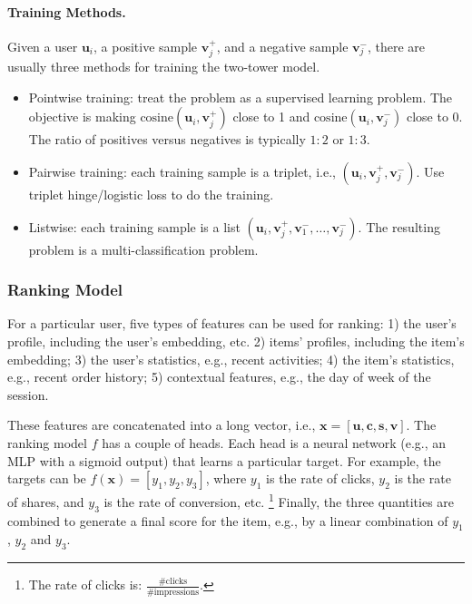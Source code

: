         \paragraph{Training Methods.}
            Given a user $\bm{u}_i$, a positive sample $\bm{v}_j^+$, and a negative sample $\bm{v}_j^-$, there are usually three methods for training the two-tower model.
            \begin{itemize}
                \item Pointwise training: treat the problem as a supervised learning problem. 
                The objective is making $\text{cosine}(\bm{u}_i, \bm{v}_j^+)$ close to 1 and $\text{cosine}(\bm{u}_i, \bm{v}_j^-)$ close to 0. 
                The ratio of positives versus negatives is typically $1:2$ or $1:3$.
                
                \item Pairwise training: each training sample is a triplet, i.e., $(\bm{u}_i, \bm{v}_j^+, \bm{v}_j^-)$. Use triplet hinge/logistic loss to do the training. 
                
                \item Listwise: each training sample is a list $(\bm{u}_i, \bm{v}_j^+, \bm{v}_1^-, \ldots, \bm{v}_j^-)$. The resulting problem is a multi-classification problem.
            \end{itemize}
    

    \subsubsection{Ranking Model}
        For a particular user, five types of features can be used for ranking: 1) the user's profile, including the user's embedding, etc. 2) items' profiles, including the item's embedding; 3) the user's statistics, e.g., recent activities; 4) the item's statistics, e.g., recent order history; 5) contextual features, e.g., the day of week of the session. 
        
        These features are concatenated into a long vector, i.e., $\bm{x} = [\bm{u}, \bm{c}, \bm{s}, \bm{v}]$.
        The ranking model $f$ has a couple of heads. Each head is a neural network (e.g., an MLP with a sigmoid output) that learns a particular target.
        For example, the targets can be $f(\bm{x}) = [y_1, y_2, y_3]$, where $y_1$ is the rate of clicks, $y_2$ is the rate of shares, and $y_3$ is the rate of conversion, etc. \footnote{The rate of clicks is: $\frac{\text{\#clicks}}{\text{\#impressions}}$.}
        Finally, the three quantities are combined to generate a final score for the item, e.g., by a linear combination of $y_1$, $y_2$ and $y_3$.


